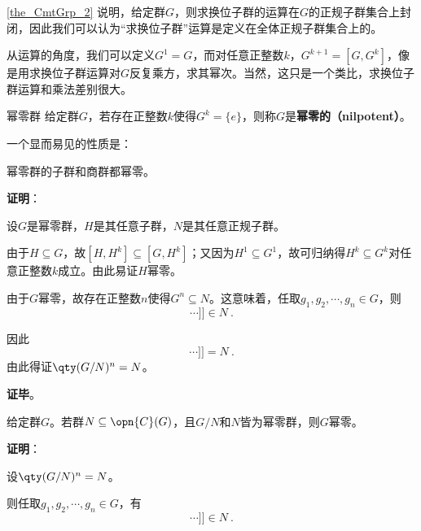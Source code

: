 




\autoref{the_CmtGrp_2} 说明，给定群$G$，则求换位子群的运算在$G$的正规子群集合上封闭，因此我们可以认为“求换位子群”运算是定义在全体正规子群集合上的。

从运算的角度，我们可以定义$G^1=G$，而对任意正整数$k$，$G^{k+1}=[G, G^{k}]$，像是用求换位子群运算对$G$反复乘方，求其幂次。当然，这只是一个类比，求换位子群运算和乘法差别很大。


\begin{definition}{幂零群}
给定群$G$，若存在正整数$k$使得$G^k=\{e\}$，则称$G$是\textbf{幂零的（nilpotent）}。
\end{definition}

一个显而易见的性质是：


\begin{lemma}{}\label{lem_NipGrp_2}
幂零群的子群和商群都幂零。
\end{lemma}

\textbf{证明}：

设$G$是幂零群，$H$是其任意子群，$N$是其任意正规子群。

由于$H\subseteq G$，故$[H, H^{k}]\subseteq [G, H^{k}]$；又因为$H^1\subseteq G^1$，故可归纳得$H^k\subseteq G^k$对任意正整数$k$成立。由此易证$H$幂零。

由于$G$幂零，故存在正整数$n$使得$G^n\subseteq N$。这意味着，任取$g_1, g_2, \cdots, g_n\in G$，则
\begin{equation}
[g_1, [g_2\cdots[g_{n-1}, g_n]\cdots]] \in N~. 
\end{equation}

因此
\begin{equation}
[g_1N, [g_2N\cdots[g_{n-1}N, g_nN]\cdots]] = N~. 
\end{equation}
由此得证$\qty(G/N)^n=N$。

\textbf{证毕}。



\begin{lemma}{}\label{lem_NipGrp_1}
给定群$G$。若群$N\subseteq \opn{C}(G)$，且$G/N$和$N$皆为幂零群，则$G$幂零。
\end{lemma}


\textbf{证明}：

设$\qty(G/N)^n=N$。

则任取$g_1, g_2, \cdots, g_n\in G$，有
\begin{equation}
[g_1, [g_2\cdots[g_{n-1}, g_n]\cdots]] \in N~. 
\end{equation}

